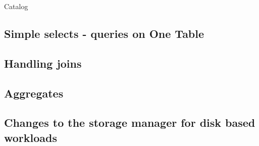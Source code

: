 Catalog

\subsection{Simple selects - queries on One Table}

\subsection{Handling joins}

\subsection{Aggregates}

\subsection{Changes to the storage manager for disk based workloads}
